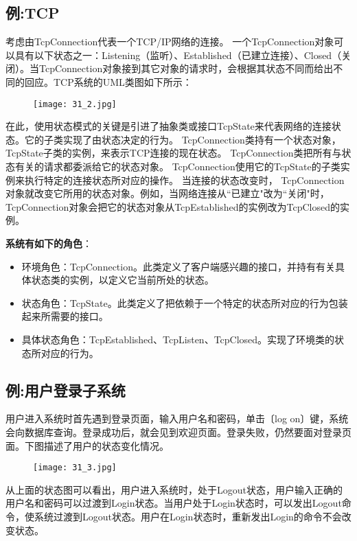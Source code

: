 \documentclass[../main.tex]{subfiles}
\begin{document}
\subsection{例:TCP}
考虑由TcpConnection代表一个TCP/IP网络的连接。
一个TcpConnection对象可以具有以下状态之一：Listening（监听）、Established（已建立连接）、Closed（关闭）。当TcpConnection对象接到其它对象的请求时，会根据其状态不同而给出不同的回应。TCP系统的UML类图如下所示：
%
\begin{figure}[H]
  \texttt{[image: 31\_2.jpg]}
\end{figure}
%
在此，使用状态模式的关键是引进了抽象类或接口TcpState来代表网络的连接状态。它的子类实现了由状态决定的行为。
TcpConnection类持有一个状态对象，TcpState子类的实例，来表示TCP连接的现在状态。 TcpConnection类把所有与状态有关的请求都委派给它的状态对象。 TcpConnection使用它的TcpState的子类实例来执行特定的连接状态所对应的操作。
当连接的状态改变时， TcpConnection对象就改变它所用的状态对象。例如，当网络连接从“已建立"改为“关闭"时， TcpConnection对象会把它的状态对象从TcpEstablished的实例改为TcpClosed的实例。

\textbf{系统有如下的角色}：
%
\begin{itemize}
  \item 环境角色：TcpConnection。此类定义了客户端感兴趣的接口，并持有有关具体状态类的实例，以定义它当前所处的状态。
  \item 状态角色：TcpState。此类定义了把依赖于一个特定的状态所对应的行为包装起来所需要的接口。
  \item 具体状态角色：TcpEstablished、TcpListen、TcpClosed。实现了环境类的状态所对应的行为。
\end{itemize}
%



%
\subsection{例:用户登录子系统}
用户进入系统时首先遇到登录页面，输入用户名和密码，单击〔log on〕键，系统会向数据库查询。登录成功后，就会见到欢迎页面。登录失败，仍然要面对登录页面。下图描述了用户的状态变化情况。
%
\begin{figure}[H]
  \texttt{[image: 31\_3.jpg]}
\end{figure}
%
从上面的状态图可以看出，用户进入系统时，处于Logout状态，用户输入正确的用户名和密码可以过渡到Login状态。当用户处于Login状态时，可以发出Logout命令，使系统过渡到Logout状态。用户在Login状态时，重新发出Login的命令不会改变状态。
\end{document}
